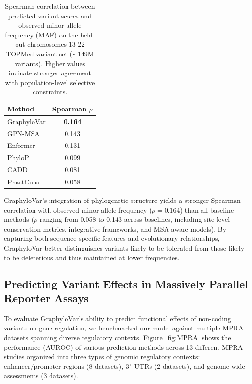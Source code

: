 \documentclass[unnumsec,webpdf,contemporary,large]{oup-authoring-template}%
\newcommand{\rev}[1]{{\color{red}#1}}
\theoremstyle{thmstyleone}%
\theoremstyle{thmstyletwo}%
\theoremstyle{thmstylethree}%
\begin{document}
\begin{table}[h!]
\centering
\caption{\rev{Spearman correlation between predicted variant scores and observed minor allele frequency (MAF) on the held-out chromosomes 13-22 TOPMed variant set ($\sim$149M variants). Higher values indicate stronger agreement with population-level selective constraints.}}
\label{tab:spearman}
\begin{tabular}{lc}
\hline
\textbf{Method} & \textbf{Spearman $\rho$} \\
\hline
GraphyloVar & \textbf{0.164} \\
GPN-MSA & 0.143 \\
Enformer & 0.131 \\
PhyloP & 0.099 \\
CADD & 0.081 \\
PhastCons & 0.058 \\
\hline
\end{tabular}
\end{table}

GraphyloVar's integration of phylogenetic structure yields a stronger Spearman correlation with observed minor allele frequency ($\rho=0.164$) than all baseline methods ($\rho$ ranging from 0.058 to 0.143 across baselines, including site-level conservation metrics, integrative frameworks, and MSA-aware models). By capturing both sequence-specific features and evolutionary relationships, GraphyloVar better distinguishes variants likely to be tolerated from those likely to be deleterious and thus maintained at lower frequencies.



\subsection{Predicting Variant Effects in Massively Parallel Reporter Assays}

To evaluate GraphyloVar's ability to predict functional effects of non-coding variants on gene regulation, we benchmarked our model against multiple MPRA datasets spanning diverse regulatory contexts. Figure~\ref{fig:MPRA} shows the performance (AUROC) of various prediction methods across 13 different MPRA studies organized into three types of genomic regulatory contexts: enhancer/promoter regions (8 datasets), 3'~UTRs (2 datasets), and genome-wide assessments (3 datasets).

\end{document}
